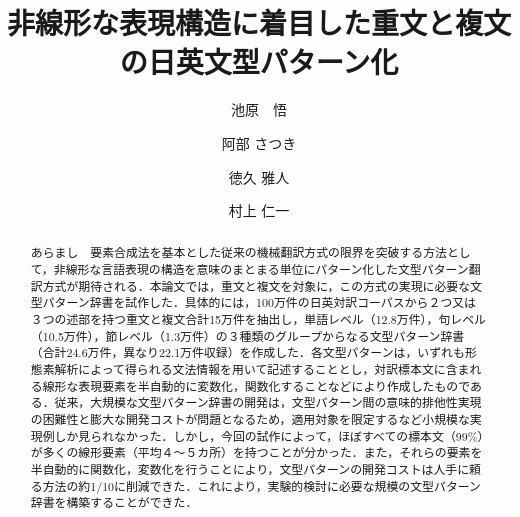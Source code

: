 \documentclass{nlp}
\begin{document}
\setcounter{page}{3}
\setcounter{Volume}{2}
\setcounter{Number}{3}
\setcounter{Month}{7}


\title{非線形な表現構造に着目した重文と複文の日英文型パターン化}
\author{池原　悟 \and 阿部  さつき \and 徳久  雅人 \and 村上  仁一}








\begin{abstract}
あらまし　要素合成法を基本とした従来の機械翻訳方式の限界を突破する方法として，非線形な言語表現の構造を意味のまとまる単位にパターン化した文型パターン翻訳方式が期待される．本論文では，重文と複文を対象に，この方式の実現に必要な文型パターン辞書を試作した．具体的には，100万件の日英対訳コーパスから２つ又は３つの述部を持つ重文と複文合計15万件を抽出し，単語レベル（12.8万件），句レベル（10.5万件），節レベル（1.3万件）の３種類のグループからなる文型パターン辞書（合計24.6万件，異なり22.1万件収録）を作成した．各文型パターンは，いずれも形態素解析によって得られる文法情報を用いて記述することとし，対訳標本文に含まれる線形な表現要素を半自動的に変数化，関数化することなどにより作成したものである．従来，大規模な文型パターン辞書の開発は，文型パターン間の意味的排他性実現の困難性と膨大な開発コストが問題となるため，適用対象を限定するなど小規模な実現例しか見られなかった．しかし，今回の試作によって，ほぼすべての標本文（99\%）が多くの線形要素（平均４〜５カ所）を持つことが分かった．また，それらの要素を半自動的に関数化，変数化を行うことにより，文型パターンの開発コストは人手に頼る方法の約1/10に削減できた．これにより，実験的検討に必要な規模の文型パターン辞書を構築することができた．
\end{abstract}


\end{document}
